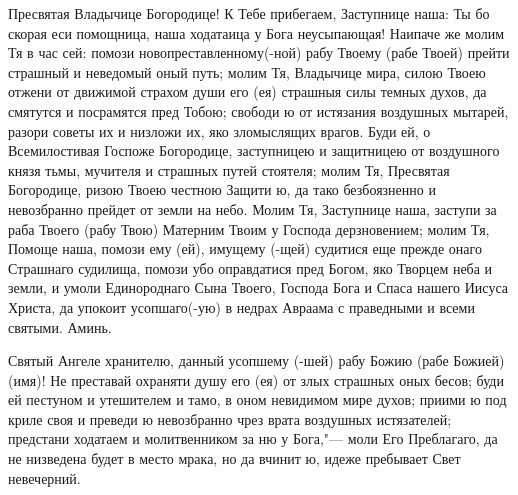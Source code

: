 \mychapterending

\begin{mymulticols}


Пресвятая Владычице Богородице! К Тебе прибегаем, Заступнице наша: Ты бо скорая еси помощница, наша ходатаица у Бога неусыпающая! Наипаче же молим Тя в час сей: помози новопреставленному(-ной) рабу Твоему (рабе Твоей)  прейти страшный и неведомый оный путь; молим Тя, Владычице мира, силою Твоею отжени от движимой страхом души его (ея) страшныя силы темных духов, да смятутся и посрамятся пред Тобою; свободи ю от истязания воздушных мытарей, разори советы их и низложи их, яко зломыслящих врагов. Буди ей, о Всемилостивая Госпоже Богородице, заступницею и защитницею от воздушного князя тьмы, мучителя и страшных путей стоятеля; молим Тя, Пресвятая Богородице, ризою Твоею честною Защити ю, да тако безбоязненно и невозбранно прейдет от земли на небо. Молим Тя, Заступнице наша, заступи за раба Твоего (рабу Твою) Матерним Твоим у Господа дерзновением; молим Тя, Помоще наша, помози ему (ей), имущему (-щей) судитися еще прежде онаго Страшнаго судилища, помози убо оправдатися пред Богом, яко Творцем неба и земли, и умоли Единороднаго Сына Твоего, Господа Бога и Спаса нашего Иисуса Христа, да упокоит усопшаго(-ую) в недрах Авраама с праведными и всеми святыми. Аминь.

\end{mymulticols}

\mychapterending

\begin{mymulticols}


Святый Ангеле хранителю, данный усопшему (-шей) рабу Божию (рабе Божией) (имя)! Не преставай охраняти душу его (ея) от злых страшных оных бесов; буди ей пестуном и утешителем и тамо, в оном невидимом мире духов; приими ю под криле своя и преведи ю невозбранно чрез врата воздушных истязателей; предстани ходатаем и молитвенником за ню у Бога,"--- моли Его Преблагаго, да не низведена будет в место мрака, но да вчинит ю, идеже пребывает Свет невечерний. 

\end{mymulticols}

\mychapterending

